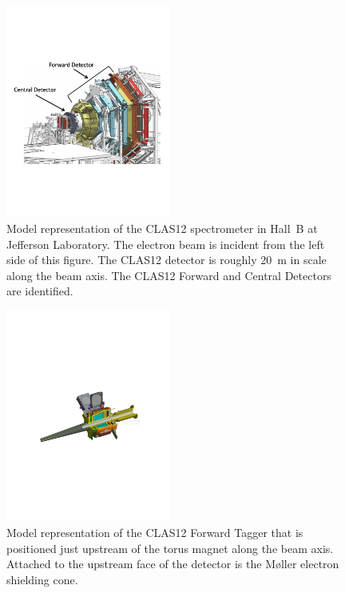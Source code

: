 \begin{figure}[t]
\centering
\includegraphics[width=0.48\textwidth]{pics/clas12-model.pdf}
\caption{Model representation of the CLAS12 spectrometer in Hall~B at Jefferson Laboratory. The electron
  beam is incident from the left side of this figure. The CLAS12 detector is roughly 20~m in scale along the
  beam axis. The CLAS12 Forward and Central Detectors are identified.}
\label{clas12-model}
\end{figure}

\begin{figure}
\centering
\includegraphics[width=0.48\textwidth]{pics/ft-model.pdf}
\caption{Model representation of the CLAS12 Forward Tagger that is positioned just upstream of the torus
  magnet along the beam axis. Attached to the upstream face of the detector is the M{\o}ller electron shielding
  cone.}
\label{ft-model}
\end{figure}

